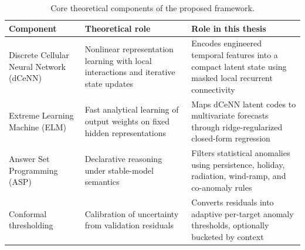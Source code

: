 \begin{table}[H]
\centering
\caption{Core theoretical components of the proposed framework.}
\label{tab:theory_components}
\begin{tabular}{|p{3.2cm}|p{4.2cm}|p{5.2cm}|}
\hline
\textbf{Component} & \textbf{Theoretical role} & \textbf{Role in this thesis} \\
\hline
Discrete Cellular Neural Network (dCeNN) & Nonlinear representation learning with local interactions and iterative state updates & Encodes engineered temporal features into a compact latent state using masked local recurrent connectivity \\
\hline
Extreme Learning Machine (ELM) & Fast analytical learning of output weights on fixed hidden representations & Maps dCeNN latent codes to multivariate forecasts through ridge-regularized closed-form regression \\
\hline
Answer Set Programming (ASP) & Declarative reasoning under stable-model semantics & Filters statistical anomalies using persistence, holiday, radiation, wind-ramp, and co-anomaly rules \\
\hline
Conformal thresholding & Calibration of uncertainty from validation residuals & Converts residuals into adaptive per-target anomaly thresholds, optionally bucketed by context \\
\hline
\end{tabular}
\end{table}

\FloatBarrier